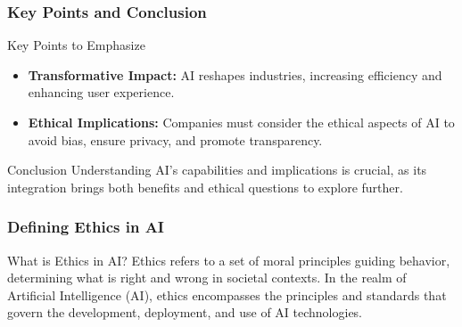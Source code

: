 \documentclass[aspectratio=169]{beamer}
\begin{document}
\begin{frame}[fragile]
    \frametitle{Key Points and Conclusion}
    \begin{block}{Key Points to Emphasize}
        \begin{itemize}
            \item \textbf{Transformative Impact:} AI reshapes industries, increasing efficiency and enhancing user experience.
            \item \textbf{Ethical Implications:} Companies must consider the ethical aspects of AI to avoid bias, ensure privacy, and promote transparency.
        \end{itemize}
    \end{block}
    
    \begin{block}{Conclusion}
        Understanding AI's capabilities and implications is crucial, as its integration brings both benefits and ethical questions to explore further.
    \end{block}
\end{frame}

\begin{frame}[fragile]
  \frametitle{Defining Ethics in AI}
  \begin{block}{What is Ethics in AI?}
    Ethics refers to a set of moral principles guiding behavior, determining what is right and wrong in societal contexts. In the realm of Artificial Intelligence (AI), ethics encompasses the principles and standards that govern the development, deployment, and use of AI technologies.
  \end{block}
\end{frame}
\end{document}
